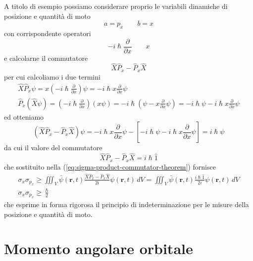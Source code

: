 A titolo di esempio possiamo considerare proprio le variabili dinamiche
di posizione e quantità di moto
\[
    a = p_x \qquad b = x
\]
con corrispondente operatori \[
                                 - i \hslash \frac{\partial}{\partial x} \qquad x
\] e calcolarne il commutatore
\[
    \hat{X}\hat{P}_{x} - \hat{P}_{x}\hat{X}
\] per cui calcoliamo i due termini \begin{gather*}
                                        \hat{X}\hat{P}_{x} \psi = x \left(  - i \hslash \frac{\partial}{\partial x} \right) \psi = - i \hslash x \frac{\partial}{\partial x}\psi\\
                                        \hat{P}_{x}(\hat{X} \psi) = \left( - i \hslash \frac{\partial}{\partial x} \right)(x \psi)  =
                                        - i \hslash \left( \psi - x \frac{\partial}{\partial x} \psi \right) = - i \hslash \psi - i \hslash x \frac{\partial}{\partial x} \psi
\end{gather*}
ed otteniamo
\[
    (\hat{X}\hat{P}_{x} - \hat{P}_{x}\hat{X}) \psi = - i \hslash x \frac{\partial}{\partial x}\psi - \left[ - i \hslash \psi - i \hslash x \frac{\partial}{\partial x} \psi \right] = i \hslash \psi
\]
da cui il valore del commutatore
\[
    \hat{X}\hat{P}_{x} - \hat{P}_{x}\hat{X} = i \hslash  \hat{1}
\]
che sostituito nella (\ref{eq:sigma-product-commutator-theorem}) fornisce
\begin{gather*}
    \sigma_{x} \sigma_{p_{x}} \geq \iiint_{V} \bar{\psi}(\bm{r},t) \frac{\hat{X}\hat{P}_{x} - \hat{P}_{x}\hat{X}}{2 i } \psi(\bm{r},t) \, dV =
    \iiint_{V} \bar{\psi}(\bm{r},t) \frac{i \hslash  \hat{1}}{2i}\psi(\bm{r},t) \, dV\\
    \sigma_{x}\sigma_{p_{x}} \geq \frac{\hslash}{2}
\end{gather*}
che esprime in forma rigorosa il principio di indeterminazione per le
misure della posizione e quantità di moto.

\section{Momento angolare orbitale}\label{sec:momento-angolare-orbitale}

